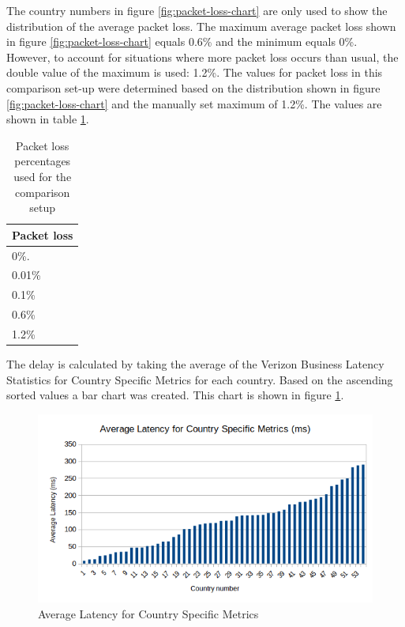 \documentclass{article}
\begin{document}
The country numbers in figure \ref{fig:packet-loss-chart} are only used to show
the distribution of the average packet loss. The maximum average packet loss
shown in figure \ref{fig:packet-loss-chart} equals 0.6\% and the minimum equals
0\%. However, to account for situations where more packet loss occurs than usual,
the double value of the maximum is used: 1.2\%. The values for packet loss in
this comparison set-up were determined based on the distribution shown in
figure \ref{fig:packet-loss-chart} and the manually set maximum of 1.2\%. The
values are shown in table \ref{table:test-packetloss}.

\begin{table}[H]
	\centering
	\begin{tabular}[H]{ | l |}
	\hline
	\textbf{Packet loss} \\
	\hline 0\%. \\
	\hline 0.01\% \\
	\hline 0.1\% \\
	\hline 0.6\% \\
	\hline 1.2\% \\
	\hline
	\end{tabular}
	\caption{Packet loss percentages used for the comparison setup}
	\label{table:test-packetloss}
\end{table}

\vspace{0.9cm}

The delay is calculated by taking the average of the Verizon Business Latency
Statistics for Country Specific Metrics for each country. Based on the
ascending sorted values a bar chart was created. This chart is shown in figure
\ref{fig:verizon-delay-chart}.

\begin{figure}[H]
	\centering
		\includegraphics[scale=0.7]{figs/verizon-delay.png}
		\caption{Average Latency for Country Specific Metrics}
	\label{fig:verizon-delay-chart}
\end{figure}
\end{document}
